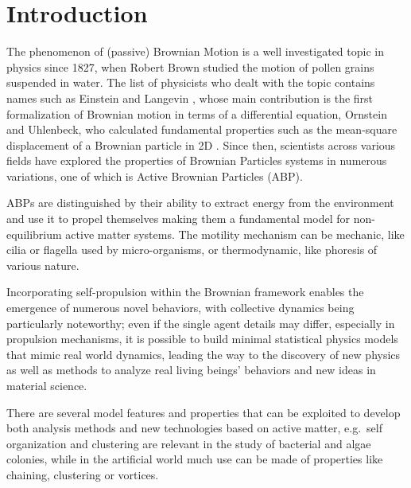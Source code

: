 \documentclass[../../master_thesis_np.tex]{subfiles}
\begin{document}
 
\chapter{Introduction}
	The phenomenon of (passive) Brownian Motion is a well investigated topic in physics since 1827, when Robert Brown studied the motion of pollen grains suspended in water. The list of physicists who dealt with the topic contains names such as Einstein and Langevin \parencite{gardiner_handbook_2004}, whose main contribution is the first formalization of Brownian motion in terms of a differential equation, Ornstein and Uhlenbeck, who calculated fundamental properties such as the mean-square displacement of a Brownian particle in 2D \parencite{uhlenbeck_theory_1930}. Since then, scientists across various fields have explored the properties of Brownian Particles systems in numerous variations, one of which is Active Brownian Particles (ABP). 
	
	ABPs are distinguished by their ability to extract energy from the environment and use it to propel themselves making them a fundamental model for non-equilibrium active matter systems.	
	The motility mechanism can be mechanic, like cilia or flagella used by micro-organisms, or thermodynamic, like phoresis of various nature. 
	
	Incorporating self-propulsion within the Brownian framework enables the emergence of numerous novel behaviors, with collective dynamics being particularly noteworthy; even if the single agent details may differ, especially in propulsion mechanisms, it is possible to build minimal statistical physics models that mimic real world dynamics, leading the way to the discovery of new physics as well as methods to analyze real living beings' behaviors and new ideas in material science. 
	
	There are several model features and properties that can be exploited to develop both analysis methods and new technologies based on active matter, e.g.\ self organization and clustering are relevant in the study of bacterial and algae colonies, while in the artificial world much use can be made of properties like chaining, clustering or vortices.
	\newpage
	
\end{document}
